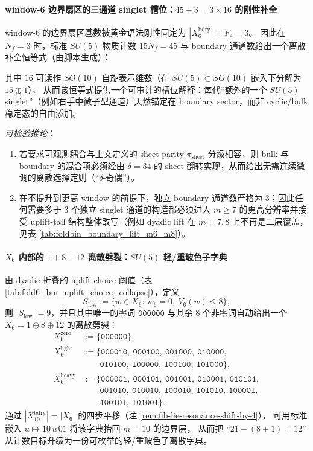 \paragraph{window-6 边界扇区的三通道 singlet 槽位：\(45+3=3\times 16\) 的刚性补全}
window-6 的边界扇区基数被黄金语法刚性固定为 \(|X_6^{\mathrm{bdry}}|=F_4=3\)。
因此在 \(N_f=3\) 时，标准 \(SU(5)\) 物质计数 \(15N_f=45\) 与 boundary 通道数给出一个离散补全恒等式（由脚本生成）：

其中 \(16\) 可读作 \(SO(10)\) 自旋表示维数（在 \(SU(5)\subset SO(10)\) 嵌入下分解为 \(15\oplus 1\)），
从而该恒等式提供一个可审计的槽位解释：每代“额外的一个 \(SU(5)\) singlet”（例如右手中微子型通道）天然锚定在 boundary sector，而非 cyclic/bulk 稳定态的自由添加。
\par
\emph{可检验推论}：
\begin{enumerate}
  \item 若要求可观测耦合与上文定义的 sheet parity \(\pi_{\mathrm{sheet}}\) 分级相容，则 bulk 与 boundary 的混合项必须经由 \(\delta=34\) 的 sheet 翻转实现，从而给出无需连续微调的离散选择定则（“\(\delta\)-奇偶”）。
  \item 在不提升到更高 window 的前提下，独立 boundary 通道数严格为 \(3\)；因此任何需要多于 \(3\) 个独立 singlet 通道的构造都必须进入 \(m\ge 7\) 的更高分辨率并接受 uplift-tail 结构整体改写（例如 dyadic lift 在 \(m=7,8\) 上不再是二层覆盖，见表 \ref{tab:foldbin_boundary_lift_m6_m8}）。
\end{enumerate}

\paragraph{\texorpdfstring{$X_6$}{X6} 内部的 $1+8+12$ 离散劈裂：\texorpdfstring{$SU(5)$}{SU(5)} 轻/重玻色子字典}
由 dyadic 折叠的 uplift-choice 阈值（表 \ref{tab:fold6_bin_uplift_choice_collapse}），定义
\[
S_{\mathrm{low}}:=\{w\in X_6:\ w_6=0,\ V_6(w)\le 8\},
\]
则 \(|S_{\mathrm{low}}|=9\)，并且其中唯一的零词 \(\texttt{000000}\) 与其余 \(8\) 个非零词自动给出一个
\(
X_6=1\oplus 8\oplus 12
\)
的离散劈裂：
\[
\begin{aligned}
X_6^{\mathrm{zero}}&:=\{\texttt{000000}\},\\
X_6^{\mathrm{light}}&:=\{\texttt{000010},\ \texttt{000100},\ \texttt{001000},\ \texttt{010000},\\
&\qquad \texttt{010100},\ \texttt{100000},\ \texttt{100100},\ \texttt{101000}\},\\
X_6^{\mathrm{heavy}}&:=\{\texttt{000001},\ \texttt{000101},\ \texttt{001001},\ \texttt{010001},\ \texttt{010101},\\
&\qquad \texttt{001010},\ \texttt{010010},\ \texttt{100010},\ \texttt{101010},\ \texttt{100001},\\
&\qquad \texttt{100101},\ \texttt{101001}\}.
\end{aligned}
\]
通过 \(|X_{10}^{\mathrm{bdry}}|=|X_6|\) 的四步平移（注 \ref{rem:fib-lie-resonance-shift-by-4}），
可用标准嵌入 \(u\mapsto 10\,u\,01\) 将该字典抬回 \(m=10\) 的边界层，
从而把 “\(21-(8+1)=12\)” 从计数目标升级为一份可枚举的轻/重玻色子离散字典。

